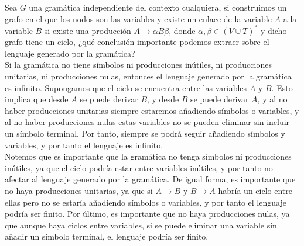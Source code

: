 \documentclass[12pt]{article}
\begin{document}
    \begin{ejercicio}[1.25 puntos]
        Sea $G$ una gramática independiente del contexto cualquiera, si construimos un grafo en el que los nodos son las variables y existe un enlace de la variable $A$ a la variable $B$ si existe una producción $A \to \alpha B \beta$, donde $\alpha, \beta \in (V \cup T)^*$ y dicho grafo tiene un ciclo, ¿qué conclusión importante podemos extraer sobre el lenguaje generado por la gramática?\\

        Si la gramática no tiene símbolos ni producciones inútiles, ni producciones unitarias, ni producciones nulas, entonces el lenguaje generado por la gramática es infinito. Supongamos que el ciclo se encuentra entre las variables $A$ y $B$. Esto implica que desde $A$ se puede derivar $B$, y desde $B$ se puede derivar $A$, y al no haber producciones unitarias siempre estaremos añadiendo símbolos o variables, y al no haber producciones nulas estas variables no se pueden eliminar sin incluir un símbolo terminal. Por tanto, siempre se podrá seguir añadiendo símbolos y variables, y por tanto el lenguaje es infinito.\\

        Notemos que es importante que la gramática no tenga símbolos ni producciones inútiles, ya que el ciclo podría estar entre variables inútiles, y por tanto no afectar al lenguaje generado por la gramática. De igual forma, es importante que no haya producciones unitarias, ya que si $A\to B$ y $B\to A$ habría un ciclo entre ellas pero no se estaría añadiendo símbolos o variables, y por tanto el lenguaje podría ser finito. Por último, es importante que no haya producciones nulas, ya que aunque haya ciclos entre variables, si se puede eliminar una variable sin añadir un símbolo terminal, el lenguaje podría ser finito.
    \end{ejercicio}
\end{document}
